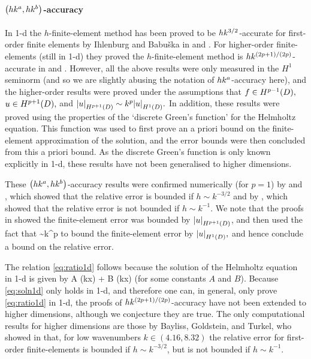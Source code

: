 \paragraph{$\hk{a}b$-accuracy} In 1-d the $h$-finite-element method has been proved to be $hk^{3/2}$-accurate for first-order finite elements by Ihlenburg and Babu\v{s}ka in \cite[Theorem 5 and Equation (3.25)]{IhBa:95a} and \cite[Equation (4.5.15)]{Ih:98}. For higher-order finite-elements (still in 1-d) they proved the $h$-finite-element method is $hk^{(2p+1)/(2p)}$-accurate in \cite[Corollary 3.2]{IhBa:97} and \cite[Theorem 4.27 and Equation 4.7.41]{Ih:98}. However, all the above results were only measured in the $H^1$ seminorm (and so we are slightly abusing the notation of $hk^{a}$-accuracy here), and the higher-order results were proved under the assumptions that $f \in \HpmoD,$ $u \in \HppoD,$ and $\SNHppoD{u} \sim k^p \SNHoD{u}.$ In addition, these results were proved using the properties of the `discrete Green's function' for the Helmholtz equation. This function was used to first prove an a priori bound on the finite-element approximation of the solution, and the error bounds were then concluded from this a priori bound. As the discrete Green's function is only known explicitly in 1-d, these results have not been generalised to higher dimensions.

These $\hk{a}b$-accuracy results were confirmed numerically (for $p=1$) by \cite[Figure 11]{IhBa:95a} and \cite[Figure 4.13]{Ih:98}, which showed that the relative error is bounded if $h \sim k^{-3/2}$ and by \cite[Figure 4.10]{Ih:98}, which showed that the relative error is not bounded if $h \sim k^{-1}.$ We note that the proofs in \cite{IhBa:95a,Ih:98} showed the finite-element error was bounded by $\SNHppoD{u}$, and then used the fact that
\beq\label{eq:ratio1d}
 \sim k^p
\eeq
to bound the finite-element error by $\SNHoD{u},$ and hence conclude a bound on the relative error.

The relation \cref{eq:ratio1d} follows because the solution of the Helmholtz equation in 1-d is given by
\beq\label{eq:soln1d}
A \cos(kx) + B \sin(kx)
\eeq
(for some constants $A$ and $B$). Because \cref{eq:soln1d} only holds in 1-d, and therefore one can, in general, only prove \cref{eq:ratio1d} in 1-d, the proofs of $hk^{(2p+1)/(2p)}$-accuracy have not been extended to higher dimensions, although we conjecture they are true. The only computational results for higher dimensions are those by Bayliss, Goldstein, and Turkel, who showed in \cite[Section 3, Tables 1--3]{BaGoTu:85} that, for low wavenumbers $k \in (4.16,8.32)$ the relative error for first-order finite-elements is bounded if $h \sim k^{-3/2}$, but is not bounded if $h \sim k^{-1}.$

